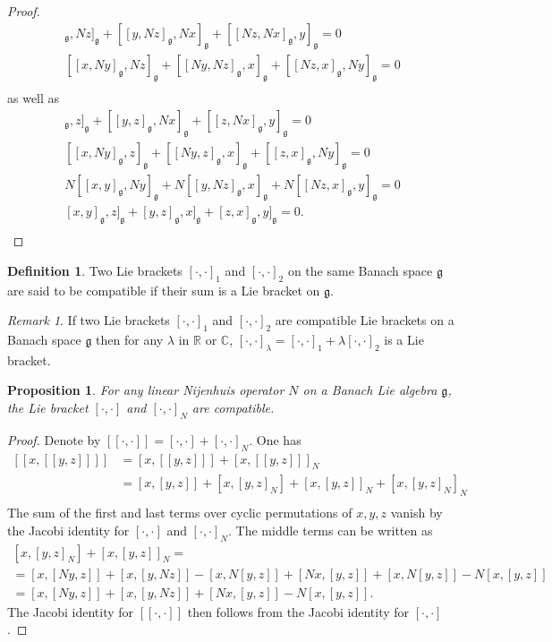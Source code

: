 \documentclass[a4paper,12pt,reqno]{amsart}%
\newtheorem{proposition}[theorem]{Proposition}
\theoremstyle{definition}
\newtheorem{definition}[theorem]{Definition}
\theoremstyle{remark}
\newtheorem{remark}[theorem]{Remark}
\numberwithin{theorem}{section}
\numberwithin{equation}{section}
\newcommand{\1}{{\bf 1}}
\newcommand{\g}{{\mathfrak g}}
\newcommand\R{{\mathbb{R}}}
\newcommand\C{{\mathbb{C}}}
\begin{document}
\begin{proof}
\begin{align*}
        [[Nx, y]_\g, Nz]_\g +  [[y, Nz]_\g, Nx]_\g + [[Nz, Nx]_\g, y]_\g = 0\\
         [[x, Ny]_\g, Nz]_\g + [[Ny, Nz]_\g, x]_\g + [[Nz, x]_\g, Ny]_\g  = 0\\
    \end{align*}
    as well as
     \begin{align*}
[[Nx, y]_\g, z]_\g +[[y, z]_\g, Nx]_\g + [[z, Nx]_\g, y]_\g  = 0\\
[[x, Ny]_\g, z]_\g +[[Ny, z]_\g, x]_\g+[[z, x]_\g, Ny]_\g= 0\\
N[[x, y]_\g, Ny]_\g+N[[y, Nz]_\g, x]_\g +N[[Nz, x]_\g, y]_\g  = 0\\
[x, y]_\g, z]_\g + [y, z]_\g, x]_\g +[z, x]_\g, y]_\g  =0.\\
     \end{align*}
\end{proof}
\begin{definition}
    Two Lie brackets $[\cdot, \cdot]_1$ and $[\cdot, \cdot]_2$ on the same Banach space $\g$ are said to be compatible if their sum is a Lie bracket on $\g$.
\end{definition}
\begin{remark}
    If two Lie brackets $[\cdot, \cdot]_1$ and $[\cdot, \cdot]_2$ are compatible Lie brackets on a Banach space $\g$ then for any $\lambda$ in $\R$ or $\C$, 
    $[\cdot, \cdot]_\lambda = [\cdot, \cdot]_1 + \lambda [\cdot, \cdot]_2$ is a Lie bracket.
\end{remark}

\begin{proposition}\label{compatibilityGN}
    For any linear Nijenhuis operator $N$ on a Banach Lie algebra $\g$, the Lie bracket $[\cdot, \cdot]$ and $[\cdot, \cdot]_N$ are compatible.
\end{proposition}

\begin{proof}
    Denote by $[\![\cdot, \cdot]\!] = [\cdot, \cdot] + [\cdot, \cdot]_N$. One has
    \[
    \begin{array}{ll}
[\![x, [\![y, z]\!] ]\!] &= [x, [\![y, z]\!] ]  + [x, [\![y, z]\!] ]_N\\
& = [x, [y, z] ]  + [x, [y, z]_N ]  + [x, [y, z] ]_N + [x, [y, z]_N ]_N\\
\end{array}
    \]
    The sum of the first and last terms over cyclic permutations of $x, y, z$ vanish by the Jacobi identity for $[\cdot, \cdot]$ and $[\cdot, \cdot]_N$. The middle terms can be written as
     \[
    \begin{array}{l}
    [x, [y, z]_N ]  + [x, [y, z] ]_N = \\
    = [x, [Ny, z] ] + [x, [y, Nz]] - [x, N[y,z] ]  + [Nx, [y, z] ] + [x, N[y,z]] - N[x, [y,z]]\\
   = [x, [Ny, z] ] + [x, [y, Nz]]   + [Nx, [y, z] ] - N[x, [y,z]].
    \end{array}
    \]
    The Jacobi identity for $[\![\cdot, \cdot]\!]$ then follows from the Jacobi identity for $[\cdot, \cdot]$.
\end{proof}
\end{document}
